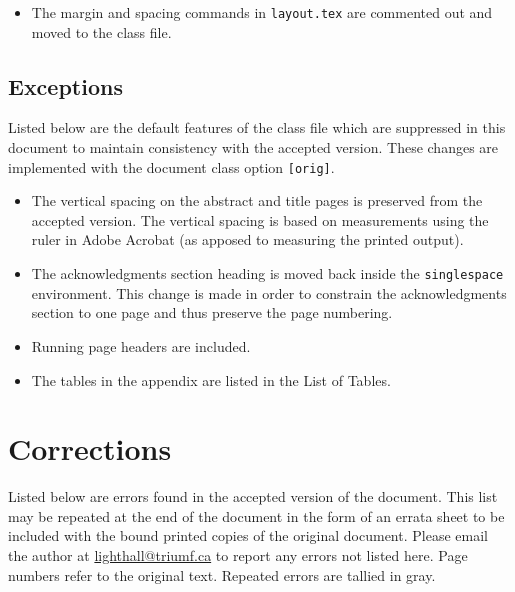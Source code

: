 \begin{spacing}{1.55}
\begin{itemize}
\begin{itemize}
			\setlength{\itemsep}{-2pt}
			\item All instances of \verb|\newcommand| are changed to \verb|\renewcommand|.
			\item The command \verb|draftno| is removed from the argument of \verb|\thesistitle|.  The argument of the command \verb|\draftno| is preceded by \verb|\\| and followed by \verb|\vspace{-1.0\baselineskip}| to maintain vertical spacing on the title page.	(see note in \S\,\ref{class_details}). 
			\item The commands \verb|\departmentname| and \verb|\adviname| are added.
		\end{itemize}
	\item The margin and spacing commands in \texttt{layout.tex} are commented out and moved to the class file.
\end{itemize}

\subsection{Exceptions}
\label{orig}
Listed below are the default features of the class file which are suppressed in this document to maintain consistency with the accepted version.  These changes are implemented with the document class option \texttt{[orig]}.
\begin{itemize}
	\setlength{\itemsep}{-4pt}
	\item The vertical spacing on the abstract and title pages is preserved from the accepted version.  The vertical spacing is based on measurements using the ruler in Adobe Acrobat (as apposed to measuring the printed output).
	\item The acknowledgments section heading is moved back inside the \texttt{singlespace} environment.  This change is made in order to constrain the acknowledgments section to one page and thus preserve the page numbering.
	\item Running page headers are included.
	\item The tables in the appendix are listed in the List of Tables.
\end{itemize}

\section{Corrections}
\label{errors}
Listed below are errors found in the accepted version of the document.  This list may be repeated at the end of the document in the form of an errata sheet to be included with the bound printed copies of the original document.  Please email the author at \href{mailto:lighthall@triumf.ca}{lighthall@triumf.ca} to report any errors not listed here.  Page numbers refer to the original text.  Repeated errors are tallied in gray.
\begin{itemize}
\setlength{\itemsep}{-4pt}	
  
\end{itemize}


\end{spacing}
